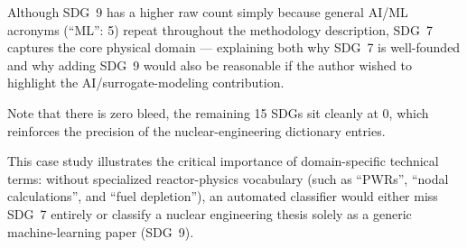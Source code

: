 \begin{casestudySection}
Although \gls{SDG}~9 has a higher raw count simply because general AI/ML acronyms (\enquote{ML}: 5) repeat throughout the methodology description, \gls{SDG}~7 captures the core physical domain --- explaining both why \gls{SDG}~7 is well-founded and why adding \gls{SDG}~9 would also be reasonable if the author wished to highlight the AI/surrogate-modeling contribution.

Note that there is zero bleed, \ie the remaining \num{15} \glspl{SDG} sit cleanly at \num{0}, which reinforces the precision of the nuclear-engineering dictionary entries.
\end{casestudySection}

\begin{takeaway}
This case study illustrates the critical importance of domain-specific technical terms: without specialized reactor-physics vocabulary (such as \enquote{PWRs}, \enquote{nodal calculations}, and \enquote{fuel depletion}), an automated classifier would either miss \gls{SDG}~7 entirely or classify a nuclear engineering thesis solely as a generic machine-learning paper (\gls{SDG}~9).
\end{takeaway}

